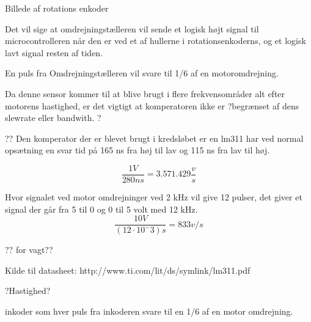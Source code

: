 Billede af rotations enkoder


Det vil sige at omdrejningstælleren vil sende et logisk højt signal til microcontrolleren når den er ved et af hullerne i  rotationsenkoderns, og et logisk lavt signal resten af tiden.

En puls fra Omdrejningstælleren vil svare til 1/6 af en motoromdrejning.


Da denne sensor kommer til at blive brugt i flere frekvensområder alt efter motorens hastighed, er det vigtigt at komperatoren ikke er ?begrænset af dens slewrate eller bandwith. ? 


??
Den komperator der er blevet brugt i kredsløbet er en lm311 har ved normal opsætning en svar tid på 165 ns fra høj til lav og 115 ns fra lav til høj.

\begin{equation}
\frac{1 V}{280 ns} = 3.571.429 \frac{v}{s}
\end{equation}

Hvor signalet ved motor omdrejninger ved 2 kHz vil give 12 pulser, det giver et signal der går fra 5 til 0 og 0 til 5 volt med 12 kHz.
\begin{equation}
\frac{10 V}{(12 \cdot 10^-3)s} = 833 v/s
\end{equation}


?? for vagt?? 



Kilde til datasheet: http://www.ti.com/lit/ds/symlink/lm311.pdf


?Hastighed?

inkoder som hver puls fra inkoderen svare til en 1/6 af en motor omdrejning. 
